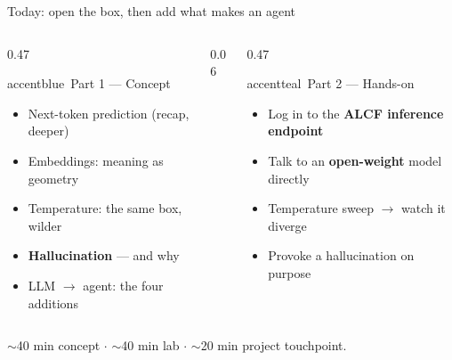 \begin{frame}{Today: open the box, then add what makes an agent}
  \begin{columns}[t, totalwidth=\textwidth]
    \begin{column}{0.47\textwidth}
      \begin{featbox}{accentblue}{\faChalkboardTeacher\ Part 1 --- Concept}
        \small
        \begin{itemize}
          \item Next-token prediction (recap, deeper)
          \item Embeddings: meaning as geometry
          \item Temperature: the same box, wilder
          \item \textbf{Hallucination} --- and why
          \item LLM $\to$ agent: the four additions
        \end{itemize}
      \end{featbox}
    \end{column}
    \begin{column}{0.06\textwidth}\end{column}
    \begin{column}{0.47\textwidth}
      \begin{featbox}{accentteal}{\faLaptopCode\ Part 2 --- Hands-on}
        \small
        \begin{itemize}
          \item Log in to the \textbf{ALCF inference endpoint}
          \item Talk to an \textbf{open-weight} model directly
          \item Temperature sweep $\to$ watch it diverge
          \item Provoke a hallucination on purpose
        \end{itemize}
      \end{featbox}
    \end{column}
  \end{columns}
  \vspace{8pt}
  \begin{center}\small\color{midgray}%
    $\sim$40 min concept $\cdot$ $\sim$40 min lab $\cdot$ $\sim$20 min project touchpoint.\end{center}
\end{frame}

